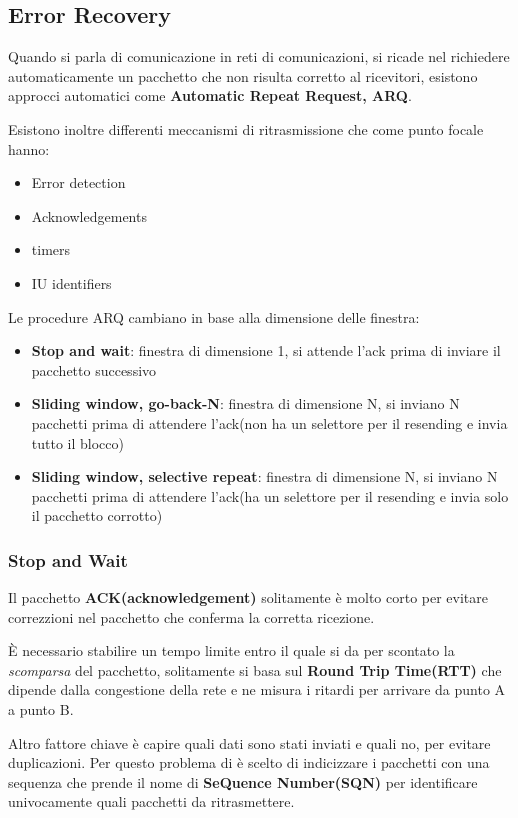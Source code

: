 \subsection{Error Recovery}
Quando si parla di comunicazione in reti di comunicazioni, si ricade nel richiedere automaticamente
un pacchetto che non risulta corretto al ricevitori,
esistono approcci automatici come \textbf{Automatic Repeat Request, ARQ}.

Esistono inoltre differenti meccanismi di ritrasmissione che come punto focale hanno:
\begin{itemize}
	\item Error detection
	\item Acknowledgements
	\item timers
	\item IU identifiers
\end{itemize}


Le procedure ARQ cambiano in base alla dimensione delle finestra:
\begin{itemize}
	\item \textbf{Stop and wait}: finestra di dimensione 1, si attende l'ack prima di inviare il pacchetto successivo
	\item \textbf{Sliding window, go-back-N}: finestra di dimensione N, si inviano N pacchetti prima di attendere l'ack(non ha un selettore per il resending e invia tutto il blocco)
	\item \textbf{Sliding window, selective repeat}: finestra di dimensione N, si inviano N pacchetti prima di attendere l'ack(ha un selettore per il resending e invia solo il pacchetto corrotto)
\end{itemize}


\subsubsection{Stop and Wait}

Il pacchetto \textbf{ACK(acknowledgement)} solitamente è molto corto per evitare
correzzioni nel pacchetto che conferma la corretta ricezione.

È necessario stabilire un tempo limite entro il quale si da per scontato
la \textit{scomparsa} del pacchetto, solitamente si basa sul \textbf{Round Trip Time(RTT)} che
dipende dalla congestione  della rete e ne misura i ritardi per arrivare da punto A a punto B.

Altro fattore chiave è capire quali dati sono stati inviati e quali no, per evitare
duplicazioni.
Per questo problema di è scelto di indicizzare i pacchetti con una sequenza che prende
il nome di \textbf{SeQuence Number(SQN)} per identificare univocamente quali pacchetti da ritrasmettere.

